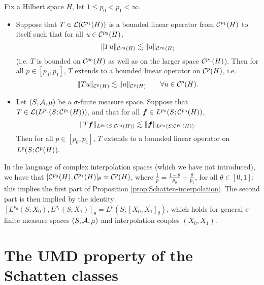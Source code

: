 \begin{prop}[Interpolation]\label{prop:Schatten-interpolation}
  Fix a Hilbert space $H$, let $1 \leq p_0 < p_1 < \infty$.
  \begin{itemize}
  \item Suppose that $T \in \mathcal{L}(\mathcal{C}^{p_{1}}(H))$ is a bounded linear operator from $\mathcal{C}^{p_{1}}(H)$ to itself such that for all $u \in \mathcal{C}^{p_{0}}(H)$,
  \begin{equation*}
    \|Tu\|_{\mathcal{C}^{p_{0}}(H)} \lesssim \|u\|_{\mathcal{C}^{p_{0}}(H)}
  \end{equation*}
  (i.e. $T$ is bounded on $\mathcal{C}^{p_0}(H)$ as well as on the larger space $\mathcal{C}^{p_1}(H)$).
  Then for all $p \in [p_0,p_1]$, $T$ extends to a bounded linear operator on $\mathcal{C}^{p}(H)$, i.e.
  \begin{equation*}
    \|Tu\|_{\mathcal{C}^{p}(H)} \lesssim \|u\|_{\mathcal{C}^{p}(H)} \qquad \forall u \in \mathcal{C}^{p}(H).
  \end{equation*}

\item Let $(S,\mathcal{A},\mu)$ be a $\sigma$-finite measure space.
  Suppose that $T \in \mathcal{L}(L^{p_1}(S;\mathcal{C}^{p_{1}}(H)))$, and that for all $\bm{f} \in L^{p_0}(S;\mathcal{C}^{p_{0}}(H))$,
  \begin{equation*}
    \|T\bm{f}\|_{L^{p_0}(S;\mathcal{C}^{p_{0}}(H))} \lesssim \|\bm{f}\|_{L^{p_0}(S;\mathcal{C}^{p_{0}}(H))}.
  \end{equation*}
  Then for all $p \in [p_0,p_1]$, $T$ extends to a bounded linear operator on $L^{p}(S;\mathcal{C}^{p}(H)$).
  \end{itemize}
\end{prop}

\begin{rmk}  In the language of complex interpolation spaces (which we have not introduced), we have that $[\mathcal{C}^{p_0}(H), \mathcal{C}^{p_1}(H)]_{\theta} = \mathcal{C}^{p}(H)$, where $\frac{1}{p} = \frac{1-\theta}{p_0} + \frac{\theta}{p_1}$, for all $\theta \in [0,1]$: this implies the first part of Proposition \ref{prop:Schatten-interpolation}.
  The second part is then implied by the identity $[L^{p_0}(S;X_{0}), L^{p_1}(S; X_{1})]_{\theta} = L^{p}(S;[X_0,X_1]_{\theta})$, which holds for general $\sigma$-finite measure spaces $(S,\mathcal{A},\mu)$ and interpolation couples $(X_0,X_1)$.
\end{rmk}

\section{The UMD property of the Schatten classes}

